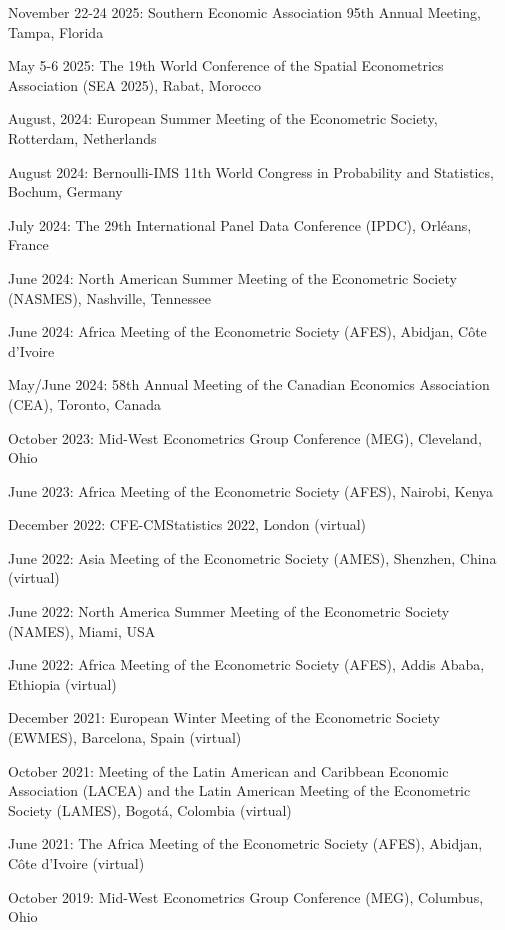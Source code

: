 \documentclass[12pt,letterpaper]{article}
\renewenvironment{itemize}{
  \begin{list}{}{
    \setlength{\leftmargin}{1.5em}
  }
}{
  \end{list}
}
\begin{document}
\begin{itemize}
  
  \item November 22-24 2025: Southern Economic Association 95th Annual Meeting, Tampa, Florida
  
  
  \item May 5-6 2025: The 19th World Conference of the Spatial Econometrics Association (SEA 2025), Rabat, Morocco
  
  \item August, 2024: European Summer Meeting of the Econometric Society, Rotterdam, Netherlands
  
  \item August 2024: Bernoulli-IMS 11th World Congress in Probability and Statistics, Bochum, Germany
  
  \item July 2024: The 29th International Panel Data Conference (IPDC), Orléans, France
  
  \item June 2024: North American Summer Meeting of the Econometric Society (NASMES), Nashville, Tennessee
  
  \item June 2024: Africa Meeting of the Econometric Society (AFES), Abidjan, Côte d'Ivoire
  
  \item May/June 2024: 58th Annual Meeting of the Canadian Economics Association (CEA), Toronto, Canada

  \item October 2023: Mid-West Econometrics Group Conference (MEG), Cleveland, Ohio
  \item June 2023: Africa Meeting of the Econometric Society (AFES), Nairobi, Kenya
  \item December 2022: CFE-CMStatistics 2022, London (virtual)
  \item June 2022: Asia Meeting of the Econometric Society (AMES), Shenzhen, China (virtual)
  \item June 2022: North America Summer Meeting of the Econometric Society (NAMES), Miami, USA
  \item June 2022: Africa Meeting of the Econometric Society (AFES), Addis Ababa, Ethiopia (virtual)
  \item December 2021: European Winter Meeting of the Econometric Society (EWMES), Barcelona, Spain (virtual)
  \item October 2021: Meeting of the Latin American and Caribbean Economic Association (LACEA) and the Latin American Meeting of the Econometric Society (LAMES), Bogotá, Colombia (virtual)
	\item June 2021: The Africa Meeting of the Econometric Society (AFES), Abidjan, C\^ote d'Ivoire (virtual)
	\item October 2019: Mid-West Econometrics Group Conference (MEG), Columbus, Ohio
\end{itemize}
\end{document}
